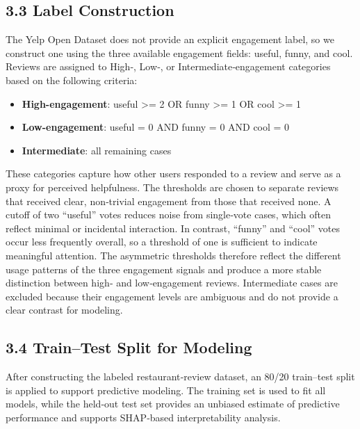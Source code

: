 \documentclass[
]{article}
\begin{document}
\hypertarget{label-construction}{%
\subsection{3.3 Label Construction}\label{label-construction}}

The Yelp Open Dataset does not provide an explicit engagement label, so
we construct one using the three available engagement fields: useful,
funny, and cool. Reviews are assigned to High‑, Low‑, or
Intermediate‑engagement categories based on the following criteria:

\begin{itemize}  
\item \textbf{High-engagement}: useful >= 2 OR funny >= 1 OR cool >= 1
\item \textbf{Low-engagement}: useful = 0 AND funny = 0 AND cool = 0  
\item \textbf{Intermediate}: all remaining cases  
\end{itemize}

These categories capture how other users responded to a review and serve
as a proxy for perceived helpfulness. The thresholds are chosen to
separate reviews that received clear, non‑trivial engagement from those
that received none. A cutoff of two ``useful'' votes reduces noise from
single‑vote cases, which often reflect minimal or incidental
interaction. In contrast, ``funny'' and ``cool'' votes occur less
frequently overall, so a threshold of one is sufficient to indicate
meaningful attention. The asymmetric thresholds therefore reflect the
different usage patterns of the three engagement signals and produce a
more stable distinction between high‑ and low‑engagement reviews.
Intermediate cases are excluded because their engagement levels are
ambiguous and do not provide a clear contrast for modeling.

\hypertarget{traintest-split-for-modeling}{%
\subsection{3.4 Train--Test Split for
Modeling}\label{traintest-split-for-modeling}}

After constructing the labeled restaurant‑review dataset, an 80/20
train--test split is applied to support predictive modeling. The
training set is used to fit all models, while the held‑out test set
provides an unbiased estimate of predictive performance and supports
SHAP‑based interpretability analysis.
\end{document}
